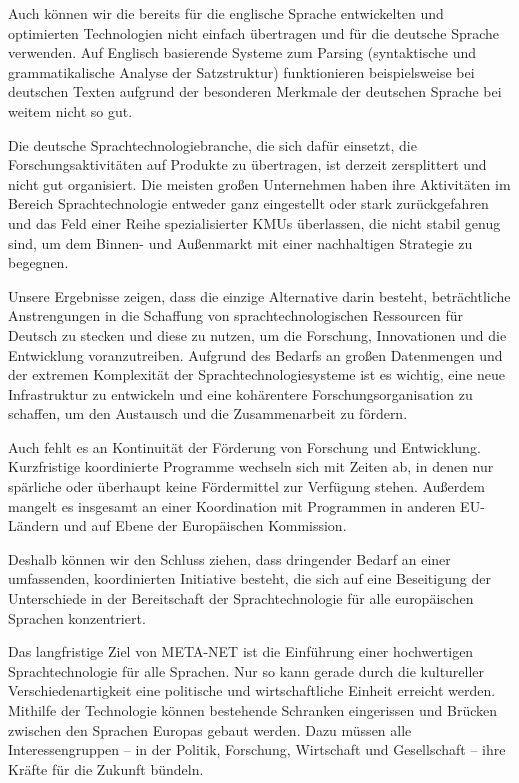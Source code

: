\documentclass[]{../../metanetpaper}
\begin{document}
\begin{Parallel}[c]{80mm}{80mm}
{Auch können wir die bereits für die englische Sprache entwickelten und optimierten Technologien nicht einfach übertragen und für die deutsche Sprache verwenden. Auf Englisch basierende Systeme zum Parsing (syntaktische und grammatikalische Analyse der Satzstruktur) funktionieren beispielsweise bei deutschen Texten aufgrund der besonderen Merkmale der deutschen Sprache bei weitem nicht so gut.

Die deutsche Sprachtechnologiebranche, die sich dafür einsetzt, die Forschungsaktivitäten auf Produkte zu übertragen, ist derzeit zersplittert und nicht gut organisiert. Die meisten großen Unternehmen haben ihre Aktivitäten im Bereich Sprachtechnologie entweder ganz eingestellt oder stark zurückgefahren und das Feld einer Reihe spezialisierter KMUs überlassen, die nicht stabil genug sind, um dem Binnen- und Außenmarkt mit einer nachhaltigen Strategie zu begegnen. 

Unsere Ergebnisse zeigen, dass die einzige Alternative darin besteht, beträchtliche Anstrengungen in die Schaffung von sprachtechnologischen Ressourcen für Deutsch zu stecken und diese zu nutzen, um die Forschung, Innovationen und die Entwicklung voranzutreiben. Aufgrund des Bedarfs an großen Datenmengen und der extremen Komplexität der Sprachtechnologiesysteme ist es wichtig, eine neue Infrastruktur zu entwickeln und eine kohärentere Forschungsorganisation zu schaffen, um den Austausch und die Zusammenarbeit zu fördern.

Auch fehlt es an Kontinuität der Förderung von Forschung und Entwicklung. Kurzfristige koordinierte Programme wechseln sich mit Zeiten ab, in denen nur spärliche oder überhaupt keine Fördermittel zur Verfügung stehen. Außerdem mangelt es insgesamt an einer Koordination mit Programmen in anderen EU-Ländern und auf Ebene der Europäischen Kommission.

Deshalb können wir den Schluss ziehen, dass dringender Bedarf an einer umfassenden, koordinierten Initiative besteht, die sich auf eine Beseitigung der Unterschiede in der Bereitschaft der Sprachtechnologie für alle europäischen Sprachen konzentriert.

Das langfristige Ziel von META-NET ist die Einführung einer hochwertigen Sprachtechnologie für alle Sprachen. Nur so kann gerade durch die kultureller Verschiedenartigkeit eine politische und wirtschaftliche Einheit erreicht werden. Mithilfe der Technologie können bestehende Schranken eingerissen und Brücken zwischen den Sprachen Europas gebaut werden. Dazu müssen alle Interessengruppen – in der Politik, Forschung, Wirtschaft und Gesellschaft – ihre Kräfte für die Zukunft bündeln.
  }


\end{Parallel}
\end{document}
